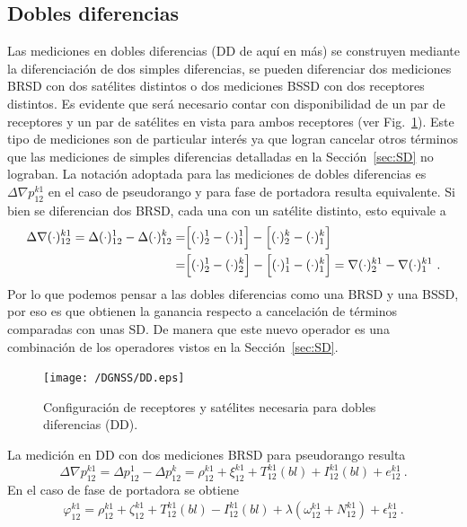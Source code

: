 \documentclass[a4paper,12pt,oneside,onecolumn,final,openright]{book}%
\begin{document}
\subsection{Dobles diferencias}\label{sec:DD}
	Las mediciones en dobles diferencias (DD de aquí en más) se construyen mediante la diferenciación de dos simples diferencias, se pueden diferenciar dos mediciones BRSD con dos satélites distintos o dos mediciones BSSD con dos receptores distintos. Es evidente que será necesario contar con disponibilidad de un par de receptores y un par de satélites en vista para ambos receptores (ver Fig.~\ref{fig:DD}). Este tipo de mediciones son de particular interés ya que logran cancelar otros términos que las mediciones de simples diferencias detalladas en la Sección~\ref{sec:SD} no lograban. La notación adoptada para las mediciones de dobles diferencias es $\Delta \nabla p_{12}^{k1}$ en el caso de pseudorango y para fase de portadora resulta equivalente. Si bien se diferencian dos BRSD, cada una con un satélite distinto, esto equivale a 
\begin{align}
	\Delta \nabla (\cdot)_{12}^{k1} = \Delta (\cdot)_{12}^1 - \Delta (\cdot)_{12}^k = &\Bigl[ (\cdot)_2^1 - (\cdot)_1^1 \Bigr] - \Bigl[ (\cdot)_2^k - (\cdot)_1^k \Bigr] \\ 
	= & \Bigl[ (\cdot)_2^1 - (\cdot)_2^k \Bigr] - \Bigl[ (\cdot)_1^1 - (\cdot)_1^k \Bigr] = \nabla(\cdot)_2^{k1} - \nabla(\cdot)_1^{k1} \ .  \nonumber
\end{align}
	Por lo que podemos pensar a las dobles diferencias como una BRSD y una BSSD, por eso es que obtienen la ganancia respecto a cancelación de términos comparadas con unas SD. De manera que este nuevo operador es una combinación de los operadores vistos en la Sección~\ref{sec:SD}.
\begin{figure}
    \centering
    \texttt{[image: /DGNSS/DD.eps]}
    \caption{Configuración de receptores y satélites necesaria para dobles diferencias (DD).}
    \label{fig:DD}
\end{figure}
	La medición en DD con dos mediciones BRSD para pseudorango resulta
\begin{equation}\label{ec:DD_pr}
	\Delta \nabla p_{12}^{k1} = \Delta p_{12}^1 - \Delta p_{12}^k = \rho_{12}^{k1} + \xi_{12}^{k1} + T_{12}^{k1}(bl) + I_{12}^{k1}(bl) + e_{12}^{k1} \ .
\end{equation}
	En el caso de fase de portadora se obtiene
\begin{align}\label{ec:DD_fdp}
	\varphi_{12}^{k1} = \rho_{12}^{k1} + \zeta_{12}^{k1} + T_{12}^{k1}(bl) - I_{12}^{k1}(bl)	+\lambda \left( \omega_{12}^{k1} + N_{12}^{k1}\right) + \epsilon_{12}^{k1} \ .
\end{align}
\end{document}

